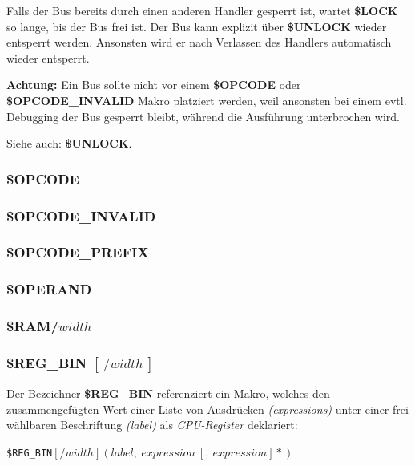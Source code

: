 \documentclass{scrartcl}
\begin{document}
\vspace{10pt}
\noindent Falls der Bus bereits durch einen anderen Handler gesperrt ist, wartet \textbf{\$LOCK} so lange, bis der Bus frei ist. Der Bus kann explizit über \textbf{\$UNLOCK} wieder entsperrt werden. Ansonsten wird er nach Verlassen des Handlers automatisch wieder entsperrt.

\vspace{10pt}
\noindent \textbf{Achtung:} Ein Bus sollte nicht vor einem \textbf{\$OPCODE} oder \textbf{\$OPCODE\_INVALID} Makro platziert werden, weil ansonsten bei einem evtl. Debugging der Bus gesperrt bleibt, während die Ausführung unterbrochen wird.

\vspace{10pt}
\noindent Siehe auch: \textbf{\$UNLOCK}.

\subsubsection{\$OPCODE}

\subsubsection{\$OPCODE\_INVALID}

\subsubsection{\$OPCODE\_PREFIX}

\subsubsection{\$OPERAND}

\subsubsection{\$RAM/$width$}

\subsubsection{\$REG\_BIN $[~/width~]$}

\noindent Der Bezeichner \textbf{\$REG\_BIN} referenziert ein Makro, welches den zusammengefügten Wert einer Liste von Ausdrücken \textit{(expressions)} unter einer frei wählbaren Beschriftung \textit{(label)} als \textit{CPU-Register} deklariert:

\vspace{10pt}
\texttt{\$REG\_BIN$[/width](label,~expression~[,~expression]*)$}
\end{document}
